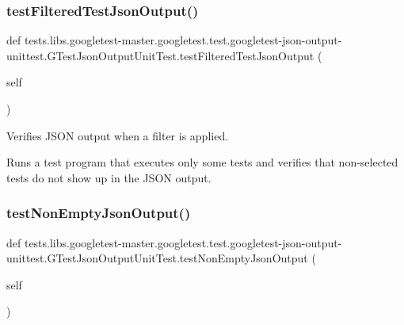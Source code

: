 \subsubsection{\texorpdfstring{test\+Filtered\+Test\+Json\+Output()}{testFilteredTestJsonOutput()}}
{\footnotesize\ttfamily def tests.\+libs.\+googletest-\/master.\+googletest.\+test.\+googletest-\/json-\/output-\/unittest.\+G\+Test\+Json\+Output\+Unit\+Test.\+test\+Filtered\+Test\+Json\+Output (\begin{DoxyParamCaption}\item[{}]{self }\end{DoxyParamCaption})}

\begin{DoxyVerb}Verifies JSON output when a filter is applied.

Runs a test program that executes only some tests and verifies that
non-selected tests do not show up in the JSON output.
\end{DoxyVerb}
 \mbox{\label{classtests_1_1libs_1_1googletest-master_1_1googletest_1_1test_1_1googletest-json-output-unittest_1_1GTestJsonOutputUnitTest_aeb718486207569a39c685019ae3330e8}} 
\subsubsection{\texorpdfstring{test\+Non\+Empty\+Json\+Output()}{testNonEmptyJsonOutput()}}
{\footnotesize\ttfamily def tests.\+libs.\+googletest-\/master.\+googletest.\+test.\+googletest-\/json-\/output-\/unittest.\+G\+Test\+Json\+Output\+Unit\+Test.\+test\+Non\+Empty\+Json\+Output (\begin{DoxyParamCaption}\item[{}]{self }\end{DoxyParamCaption})}

